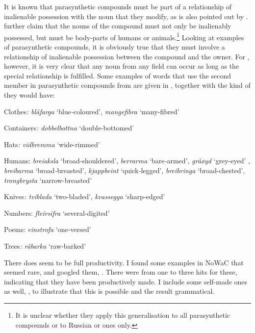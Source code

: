 \documentclass[output=paper]{LSP/langsci}
\begin{document}
It is known that parasynthetic compounds must be part of a relationship of inalienable possession with the noun that they modify, as is also pointed out by \citet{Grov2009}. \citet[210]{MelloniBisetto2010} further claim that the nouns of the compound must not only be inalienably possessed, but must be body-parts of humans or animals.\footnote{It is unclear whether they apply this generalisation to all parasynthetic compounds or to Russian or  ones only.} Looking at examples of parasynthetic compounds, it is obviously true that they must involve a relationship of inalienable possession between the compound and the owner. For , however, it is very clear that any noun from any  field can occur as long as the special relationship is fulfilled. Some examples of words that use the second member in parasynthetic compounds from  are given in , together with the kind of  they would have:

\ea%
    \label{ex:bondi:13}


Clothes\textit{: blåfarga} ‘blue\textit{{}-}coloured’, \textit{mangefibra} ‘many-fibred’

Containers\textit{: dobbelbottna} ‘double-bottomed’\textit{} 

Hats\textit{: vidbremma} ‘wide-rimmed’

Humans: \textit{brei}\textit{aksla} ‘broad-shouldered’, \textit{berrarma} ‘bare\textit{{}-}armed’, \textit{gråøyd} ‘grey-eyed’ \textit{, breibarma} ‘broad\textit{{}-}breasted’, \textit{kjappbeint} ‘quick\textit{{}-}legged’, \textit{breibringa} ‘broad-chested’, \textit{trongbrysta} ‘narrow-breasted’\textit{} 

Knives\textit{: tviblada} ‘two-bladed’, \textit{kvassegga} ‘sharp-edged’

Numbers: \textit{fleirsifra} ‘several-digited’

Poems: \textit{einstrofa} ‘one-versed’\textit{} 

Trees\textit{: råbarka} ‘raw-barked’\textit{} 
\z

There does seem to be full productivity.  I found some examples in NoWaC that seemed rare, and  googled them, . There were from one to three hits for these, indicating that they have been productively made. I include some self-made ones as well, , to illustrate that this is possible and the result grammatical. 

\ea%
    \label{ex:bondi:14}
   
\end{document}
